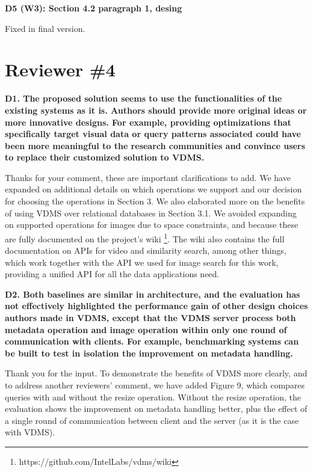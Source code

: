 \documentclass[11pt]{proposalnsf}
\begin{document}
\bigskip
\noindent %
\textbf{
D5 (W3): Section 4.2 paragraph 1, desing
}\bigskip

Fixed in final version.

\bigskip

\newpage
\section{Reviewer \#4}

\noindent %
\textbf{
D1. The proposed solution seems to use the functionalities of the existing systems
as it is. Authors should provide more original ideas or more innovative designs.
For example, providing optimizations that specifically target visual data or query
patterns associated could have been more meaningful to the research communities and
convince users to replace their customized solution to VDMS.
}\bigskip


Thanks for your comment, these are important clarifications to add.
We have expanded on additional details on which operations we support and our
decision for choosing the operations in Section 3.
We also elaborated more on the benefits of
using VDMS over relational databases in Section 3.1.
We avoided expanding on supported operations for images due to space constraints,
and because these are fully documented on the project's wiki
\footnote{https://github.com/IntelLabs/vdms/wiki}.
The wiki also contains the full documentation on APIs for video and similarity
search, among other things, which work together with the API we used for
image search for this work, providing a unified API for all the data applications need.

\bigskip
\noindent %
\textbf{
D2. Both baselines are similar in architecture, and the evaluation has not effectively
highlighted the performance gain of other design choices authors made in VDMS,
except that the VDMS server process both metadata operation and image operation
within only one round of communication with clients.
For example, benchmarking systems can be built to test in isolation the
improvement on metadata handling.
}\bigskip

Thank you for the input.
To demonstrate the benefits of VDMS more clearly, and to address another
reviewers' comment,  we have added Figure 9, which compares queries
with and without the resize operation.
Without the resize operation, the evaluation shows the
improvement on metadata handling better, plus the effect of a single round
of communication between client and the server (as it is the case with VDMS).
\end{document}
